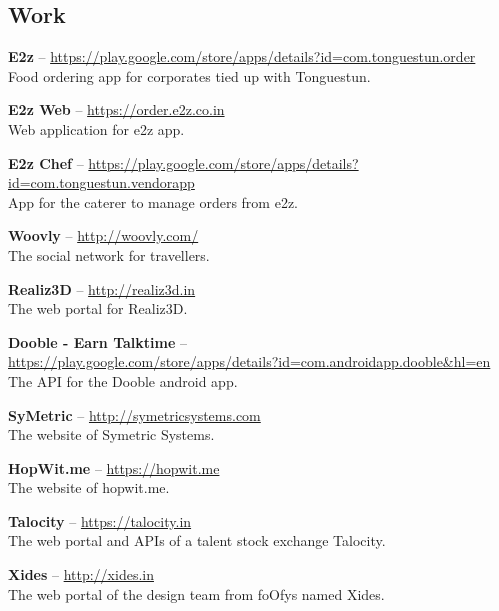\documentclass[11pt,a4paper]{moderncv}
\begin{document}
\subsection{Work}

\cvlistitem
{\textbf{E2z} -- {\small \href{https://play.google.com/store/apps/details?id=com.tonguestun.order}{https://play.google.com/store/apps/details?id=com.tonguestun.order}}
  \\Food ordering app for corporates tied up with Tonguestun.
}

\cvlistitem
{\textbf{E2z Web} -- {\small \href{https://order.e2z.co.in}{https://order.e2z.co.in}}
  \\Web application for e2z app.
}

\cvlistitem
{\textbf{E2z Chef} -- {\small \href{https://play.google.com/store/apps/details?id=com.tonguestun.vendorapp}{https://play.google.com/store/apps/details?id=com.tonguestun.vendorapp}}
  \\App for the caterer to manage orders from e2z.
}

\cvlistitem
{\textbf{Woovly} -- {\small \href{http://woovly.com/}{http://woovly.com/}}
  \\The social network for travellers.
}

\cvlistitem
{\textbf{Realiz3D} -- {\small \href{http://realiz3d.in}{http://realiz3d.in}}
  \\The web portal for Realiz3D.
}

\cvlistitem
{\textbf{Dooble - Earn Talktime} -- \\ {\small \href{https://play.google.com/store/apps/details?id=com.androidapp.dooble\&hl=en}{https://play.google.com/store/apps/details?id=com.androidapp.dooble\&hl=en}}
  \\The API for the Dooble android app.
}

\cvlistitem
{\textbf{SyMetric} -- {\small \href{http://symetricsystems.com}{http://symetricsystems.com}}
  \\The website of Symetric Systems.
}

\cvlistitem
{\textbf{HopWit.me} -- {\small \href{https://hopwit.me}{https://hopwit.me}}
  \\The website of hopwit.me.
}

\cvlistitem
{\textbf{Talocity} -- {\small \href{https://talocity.in}{https://talocity.in}}
  \\The web portal and APIs of a talent stock exchange Talocity.
}

\cvlistitem
{\textbf{Xides} -- {\small \href{http://xides.in}{http://xides.in}}
  \\The web portal of the design team from foOfys named Xides.
}
\end{document}
